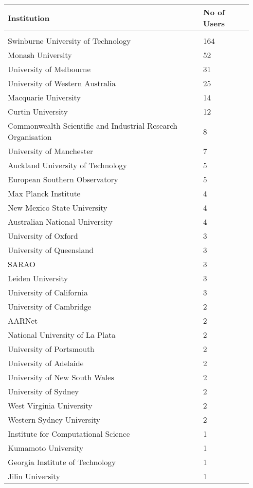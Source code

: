 \documentclass{article}%
\begin{document}
%
\begin{longtabu}{X[l] X[r]}%
\textbf{Institution}&\textbf{No of Users}\\%
\hline%
&\\%
Swinburne University of Technology&164\\%
\hline%
Monash University&52\\%
\hline%
University of Melbourne&31\\%
\hline%
University of Western Australia&25\\%
\hline%
Macquarie University&14\\%
\hline%
Curtin University&12\\%
\hline%
Commonwealth Scientific and Industrial Research Organisation&8\\%
\hline%
University of Manchester&7\\%
\hline%
Auckland University of Technology&5\\%
\hline%
European Southern Observatory&5\\%
\hline%
Max Planck Institute&4\\%
\hline%
New Mexico State University&4\\%
\hline%
Australian National University&4\\%
\hline%
University of Oxford&3\\%
\hline%
University of Queensland&3\\%
\hline%
SARAO&3\\%
\hline%
Leiden University&3\\%
\hline%
University of California&3\\%
\hline%
University of Cambridge&2\\%
\hline%
AARNet&2\\%
\hline%
National University of La Plata&2\\%
\hline%
University of Portsmouth&2\\%
\hline%
University of Adelaide&2\\%
\hline%
University of New South Wales&2\\%
\hline%
University of Sydney&2\\%
\hline%
West Virginia University&2\\%
\hline%
Western Sydney University&2\\%
\hline%
Institute for Computational Science&1\\%
\hline%
Kumamoto University&1\\%
\hline%
Georgia Institute of Technology&1\\%
\hline%
Jilin University&1\\%

\end{longtabu}
\end{document}
